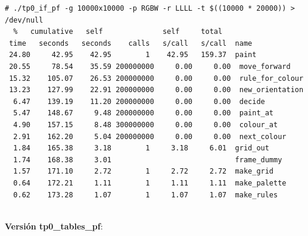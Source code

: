 \documentclass[a4paper, 10pt, twoside, notitlepage]{article}
\begin{document}
\begin{verbatim}
# ./tp0_if_pf -g 10000x10000 -p RGBW -r LLLL -t $((10000 * 20000)) > /dev/null
  %   cumulative   self              self     total           
 time   seconds   seconds    calls   s/call   s/call  name    
 24.80     42.95    42.95        1    42.95   159.37  paint
 20.55     78.54    35.59 200000000     0.00     0.00  move_forward
 15.32    105.07    26.53 200000000     0.00     0.00  rule_for_colour
 13.23    127.99    22.91 200000000     0.00     0.00  new_orientation
  6.47    139.19    11.20 200000000     0.00     0.00  decide
  5.47    148.67     9.48 200000000     0.00     0.00  paint_at
  4.90    157.15     8.48 300000000     0.00     0.00  colour_at
  2.91    162.20     5.04 200000000     0.00     0.00  next_colour
  1.84    165.38     3.18        1     3.18     6.01  grid_out
  1.74    168.38     3.01                             frame_dummy
  1.57    171.10     2.72        1     2.72     2.72  make_grid
  0.64    172.21     1.11        1     1.11     1.11  make_palette
  0.62    173.28     1.07        1     1.07     1.07  make_rules


\end{verbatim}
\normalsize

\textbf{Versión tp0\_tables\_pf}:
\end{document}
